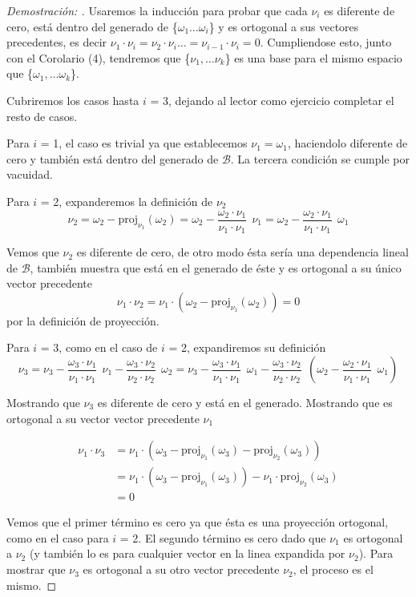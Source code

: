 \documentclass[11pt]{article}
\theoremstyle{definition}
\begin{document}
\begin{proof}[Demostración: ]
	Usaremos la inducción para probar que cada $\nu_i$ es diferente de cero, está dentro del generado de \{$\omega_1\dots\omega_i$\} y es ortogonal a sus vectores precedentes, es decir $\nu_1\cdot\nu_i = \nu_2\cdot\nu_i\dots = \nu_{i-1}\cdot\nu_i=0$. Cumpliendose esto, junto con el Corolario (4), tendremos que \{$\nu_1,\dots\nu_k$\} es una base para el mismo espacio que \{$\omega_1,\dots\omega_k$\}.

Cubriremos los casos hasta $i$ = 3, dejando al lector como ejercicio completar el resto de casos.

Para $i$ = 1, el caso es trivial ya que establecemos $\nu_1 = \omega_1$, haciendolo diferente de cero y también está dentro del generado de $\mathcal{B}$. La tercera condición se cumple por vacuidad.

Para $i$ = 2, expanderemos la definición de $\nu_2$
\[\nu_2 = \omega_2 - \textrm{proj}_{\nu_1}(\omega_2) = \omega_2 - \frac{\omega_2\cdot\nu_1}{\nu_1\cdot\nu_1}\:\:\nu_1 = \omega_2 - \frac{\omega_2\cdot\nu_1}{\nu_1\cdot\nu_1}\:\:\omega_1\]

Vemos que $\nu_2$ es diferente de cero, de otro modo ésta sería una dependencia lineal de $\mathcal{B}$, también muestra que está en el generado de éste y es ortogonal a su único vector precedente
\[\nu_1\cdot\nu_2 = \nu_1\cdot(\omega_2-\textrm{proj}_{\nu_1}(\omega_2)) = 0\] 
por la definición de proyección.

Para $i$ = 3, como en el caso de $i$ = 2, expandiremos su definición
\[\nu_3 = \nu_3-\frac{\omega_3\cdot\nu_1}{\nu_1\cdot\nu_1}\:\:\nu_1 - \frac{\omega_3\cdot\nu_2}{\nu_2\cdot\nu_2}\:\:\omega_2 = \nu_3-\frac{\omega_3\cdot\nu_1}{\nu_1\cdot\nu_1}\:\:\omega_1 -  \frac{\omega_3\cdot\nu_2}{\nu_2\cdot\nu_2}\:\:(\omega_2-\frac{\omega_2\cdot\nu_1}{\nu_1\cdot\nu_1}\:\:\omega_1)\]

Mostrando que $\nu_3$ es diferente de cero y está en el generado. Mostrando que es ortogonal a su vector vector precedente $\nu_1$

\begin{align*}
	\nu_1\cdot\nu_3 & = \nu_1\cdot(\omega_3-\textrm{proj}_{\nu_1}(\omega_3) - \textrm{proj}_{\nu_2}(\omega_3))\\
	&= \nu_1\cdot(\omega_3 - \textrm{proj}_{\nu_1}(\omega_3)) - \nu_1\cdot\textrm{proj}_{\nu_2}(\omega_3) \\
	&= 0
\end{align*}

Vemos que el primer término es cero ya que ésta es una proyección ortogonal, como en el caso para $i$ = 2. El segundo término es cero dado que $\nu_1$ es ortogonal a $\nu_2$ (y también lo es para cualquier vector en la linea expandida por $\nu_2$). Para mostrar que $\nu_3$ es ortogonal a su otro vector precedente $\nu_2$, el proceso es el mismo.
\end{proof}
\end{document}

